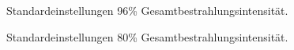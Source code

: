 \documentclass[a4paper,bibtotoc,oneside]{scrbook}
\begin{document}
\begin{figure} [htbp]
\caption{Standardeinstellungen 96\% Gesamtbestrahlungsintensität.}
\label{st96}
\end{figure} 

\begin{figure} [htbp]
\caption{Standardeinstellungen 80\% Gesamtbestrahlungsintensität.}
\label{st80}
\end{figure} 
\end{document}
